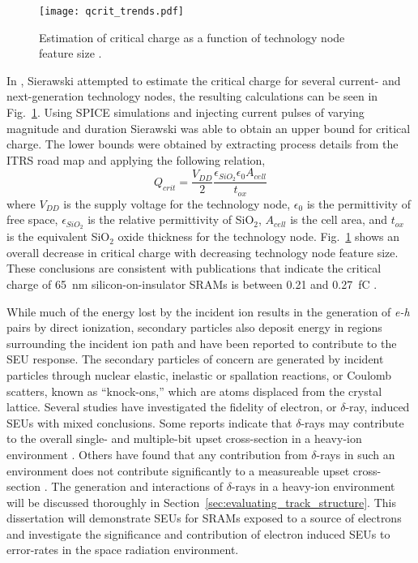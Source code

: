 \begin{figure}[tb]
    \begin{center}
        \texttt{[image: qcrit\_trends.pdf]}
    \end{center}
    \caption[Estimation of critical charge as a function of technology node feature size.]
    {Estimation of critical charge as a function of technology node feature size \cite{Sierawski:2011tc}.}
    \label{fig:qcrit_trends}
\end{figure}
In \cite{Sierawski:2011tc}, Sierawski attempted to estimate the critical charge for several current- and next-generation technology nodes, the resulting calculations can be seen in Fig.~\ref{fig:qcrit_trends}.
Using SPICE simulations and injecting current pulses of varying magnitude and duration Sierawski was able to obtain an upper bound for critical charge.
The lower bounds were obtained by extracting process details from the ITRS road map \cite{itrs:2012} and applying the following relation,
\begin{equation}
    \label{eq:qcrit}
    Q_{crit} = \frac{V_{DD}}{2}\frac{\epsilon_{SiO_2} \epsilon_0 A_{cell}}{t_{ox}}
\end{equation}
where $V_{DD}$ is the supply voltage for the technology node, $\epsilon_{0}$ is the permittivity of free space, $\epsilon_{SiO_2}$ is the relative permittivity of SiO$_2$, $A_{cell}$ is the cell area, and $t_{ox}$ is the equivalent SiO$_2$ oxide thickness for the technology node.
Fig.~\ref{fig:qcrit_trends} shows an overall decrease in critical charge with decreasing technology node feature size.
These conclusions are consistent with publications that indicate the critical charge of 65~nm silicon-on-insulator SRAMs is between 0.21 and 0.27~fC \cite{Rodbell:2007vl}.

While much of the energy lost by the incident ion results in the generation of \emph{e-h} pairs by direct ionization, secondary particles also deposit energy in regions surrounding the incident ion path and have been reported to contribute to the SEU response.
The secondary particles of concern are generated by incident particles through nuclear elastic, inelastic or spallation reactions, or Coulomb scatters, known as ``knock-ons,'' which are atoms displaced from the crystal lattice.
Several studies have investigated the fidelity of electron, or $\delta$-ray, induced SEUs with mixed conclusions.
Some reports indicate that $\delta$-rays may contribute to the overall single- and multiple-bit upset cross-section in a heavy-ion environment \cite{King:2010cu,King:2012cb}.
Others have found that any contribution from $\delta$-rays in such an environment does not contribute significantly to a measureable upset cross-section \cite{Raine:gk,Raine:2012gi,Barak:2012im}.
The generation and interactions of $\delta$-rays in a heavy-ion environment will be discussed thoroughly in Section~\ref{sec:evaluating_track_structure}.
This dissertation will demonstrate SEUs for SRAMs exposed to a source of electrons and investigate the significance and contribution of electron induced SEUs to error-rates in the space radiation environment.

